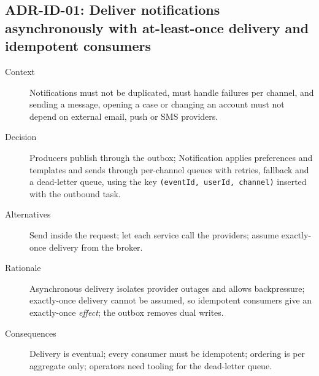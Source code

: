 \subsection{ADR-ID-01: Deliver notifications asynchronously with at-least-once delivery and idempotent consumers}
\begin{description}
  \item[Context] Notifications must not be duplicated, must handle failures
    per channel, and sending a message, opening a case or changing an account
    must not depend on external email, push or SMS providers.
  \item[Decision] Producers publish through the outbox; Notification applies
    preferences and templates and sends through per-channel queues with
    retries, fallback and a dead-letter queue, using the key
    \texttt{(eventId, userId, channel)} inserted with the outbound task.
  \item[Alternatives] Send inside the request; let each service call the
    providers; assume exactly-once delivery from the broker.
  \item[Rationale] Asynchronous delivery isolates provider outages and allows
    backpressure; exactly-once delivery cannot be assumed, so idempotent
    consumers give an exactly-once \emph{effect}; the outbox removes dual
    writes.
  \item[Consequences] Delivery is eventual; every consumer must be
    idempotent; ordering is per aggregate only; operators need tooling for the
    dead-letter queue.
\end{description}
